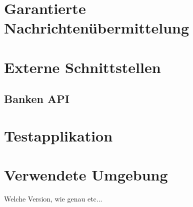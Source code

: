 


\section{Garantierte Nachrichtenübermittelung}

\section{Externe Schnittstellen}
\subsection{Banken API}
\label{subsec:implementation:bankApi}

\section{Testapplikation}
\label{subsec:implementation:TestApplikation}

\section{Verwendete Umgebung}
Welche Version, wie genau etc...
